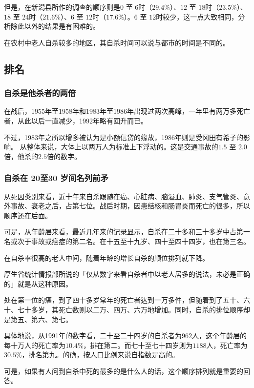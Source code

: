 \documentclass[UTF8]{ctexart}
\begin{document}
但是，在新潟县所作的调查的顺序则是$0$ 至 $6$时（$29.4\%$）、$12$ 至 $18$时（$23.5\%$）、$18$ 至 $24$时（$21.6\%$）、$6$ 至 $12$时（$17.6\%$）。$6$ 至 $12$时较少，这一点大致相同，分析除此以外的结果是有困难的。

在农村中老人自杀较多的地区，其自杀时间可以说与都市的时间是不同的。

\subsection{排名}

\subsubsection*{自杀是他杀者的两倍}

在战后，1955年至1958年和1983年至1986年出现过两次高峰，一年里有两万多死亡者，从此以后一直减少，1992年略有回升而已。

不过，1983年之所以增多被认为是小额信贷的缘故，1986年则是受冈田有希子的影响。
从整体来说，大体上以两万人为标准上下浮动的。这是交通事故的$1.5$ 至 $2.0$倍，他杀的$2.5$倍的数字。

\subsubsection*{自杀在 20至30 岁间名列前矛}

从死因类别来看，近十年来自杀跟随在癌、心脏病、脑溢血、肺炎、支气管炎、意外事故、衰老之后，占第七位。战后时期，因患结核和肠胃炎而死亡的很多，所以顺序还在后面。

可是，从年龄层来看，最近几年来的记录显示，自杀在二十多和三十多岁中占第一名或次于事故或癌症的第二名。在十五至十九岁、四十至四十四岁，也在第三名。

在自杀率很高的老人中间，随着年龄的增长自杀的顺位排列就下降。

厚生省统计情报部所说的「仅从数字来看自杀者中以老人居多的说法，未必是正确的」就是从这种原因。

处在第一位的癌，到了四十多岁常年的死亡者达到一万多件，但随着到了五十、六十、七十多岁，其死亡数则以二万、四万、六万地增加。同时，自杀的排位顺序却是第五、第六、第七。

具体地说，从1991年的数字看，二十至二十四岁的自杀者为$962$人，这个年龄层的每十万人的死亡率为$10.4\%$，排在第二。而七十至七十四岁则为$1188$人，死亡率为$30.5\%$，排名第九。的确，按人口比例来说自指数是高的。

可是，如果有人问到自杀中死的最多的是什么人的话，这个顺序排列就是重要的回答。
\end{document}
